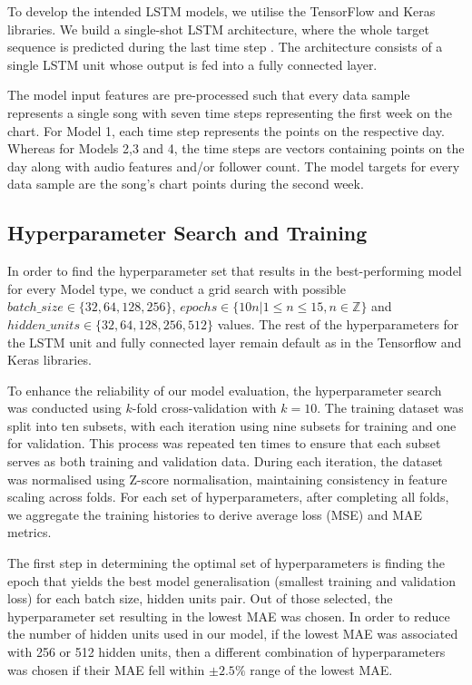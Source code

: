 \documentclass{article}
\begin{document}
To develop the intended LSTM models, we utilise the TensorFlow and Keras libraries. We build a single-shot LSTM architecture, where the whole target sequence is predicted during the last time step \cite{tensorflowTimeSeries}. The architecture consists of a single LSTM unit whose output is fed into a fully connected layer. 

The model input features are pre-processed such that every data sample represents a single song with seven time steps representing the first week on the chart. For Model 1, each time step represents the points on the respective day. Whereas for Models 2,3 and 4, the time steps are vectors containing points on the day along with audio features and/or follower count. The model targets for every data sample are the song's chart points during the second week.
 
\subsection{Hyperparameter Search and Training}

In order to find the hyperparameter set that results in the best-performing model for every Model type, we conduct a grid search with possible $batch\_size \in \{32,64,128,256\}$, $epochs \in \{10n | 1 \leq n \leq 15, n \in \mathbb{Z}\}$ and $hidden\_units \in \{32,64,128,256,512\}$ values. The rest of the hyperparameters for the LSTM unit and fully connected layer remain default as in the Tensorflow and Keras libraries\cite{TF_LSTM}\cite{TF_Dense}.

To enhance the reliability of our model evaluation, the hyperparameter search was conducted using $k$-fold cross-validation with $k = 10$. The training dataset was split into ten subsets, with each iteration using nine subsets for training and one for validation. This process was repeated ten times to ensure that each subset serves as both training and validation data. During each iteration, the dataset was normalised using Z-score normalisation, maintaining consistency in feature scaling across folds. For each set of hyperparameters, after completing all folds, we aggregate the training histories to derive average loss (MSE) and MAE metrics. 

The first step in determining the optimal set of hyperparameters is finding the epoch that yields the best model generalisation (smallest training and validation loss) for each batch size, hidden units pair. Out of those selected, the hyperparameter set resulting in the lowest MAE was chosen. In order to reduce the number of hidden units used in our model, if the lowest MAE was associated with 256 or 512
hidden units, then a different combination of hyperparameters was chosen if their MAE fell within
$\pm2.5 \% $ range of the lowest MAE. 
\end{document}
